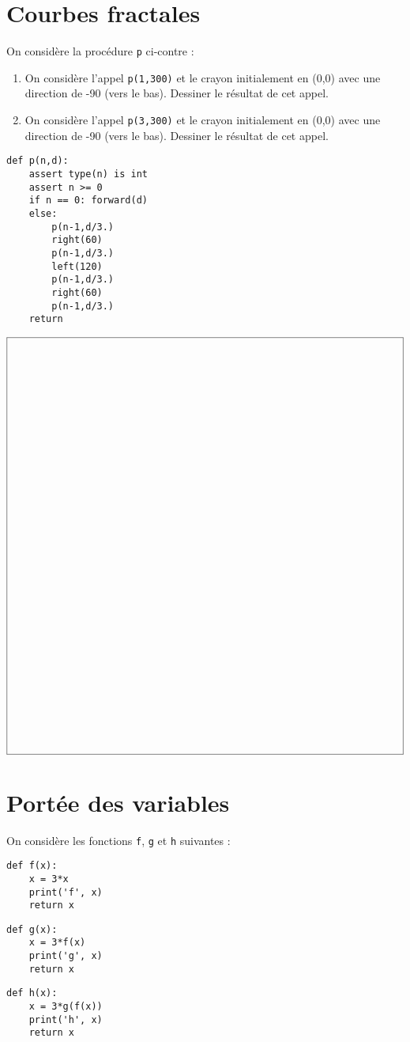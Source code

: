 \documentclass[11pt,a4paper]{article}
\begin{document}
\section{Courbes fractales}
\begin{minipage}[t]{7cm}
On consid\`ere la proc\'edure {\tt p} ci-contre :
\begin{enumerate}
\item On consid\`ere l'appel {\tt p(1,300)} et le crayon initialement en (0,0)
	avec une direction de -90 (vers le bas).
	Dessiner le r\'esultat de cet appel.
\item On consid\`ere l'appel {\tt p(3,300)} et le crayon initialement en (0,0)
	avec une direction de -90 (vers le bas).
	Dessiner le r\'esultat de cet appel.
\end{enumerate}
\end{minipage}
\hfill
\begin{py}{7cm}
\begin{verbatim}
def p(n,d):
    assert type(n) is int
    assert n >= 0
    if n == 0: forward(d)
    else:
        p(n-1,d/3.)
        right(60)
        p(n-1,d/3.)
        left(120)
        p(n-1,d/3.)
        right(60)
        p(n-1,d/3.)
    return
\end{verbatim}
\end{py}


$$\framebox[14.5cm]{$\rule{0cm}{15cm}$}$$

\section{Portée des variables}
On considère les fonctions {\tt f}, {\tt g} et {\tt h} suivantes :
\begin{center}
\begin{py}{4cm}
\begin{verbatim}
def f(x):
    x = 3*x
    print('f', x)
    return x
\end{verbatim}
\end{py}\hspace*{1cm}
\begin{py}{4cm}
\begin{verbatim}
def g(x):
    x = 3*f(x)
    print('g', x)
    return x
\end{verbatim}
\end{py}\hspace*{1cm}
\begin{py}{4cm}
\begin{verbatim}
def h(x):
    x = 3*g(f(x))
    print('h', x)
    return x
\end{verbatim}
\end{py}
\end{center}
\end{document}
